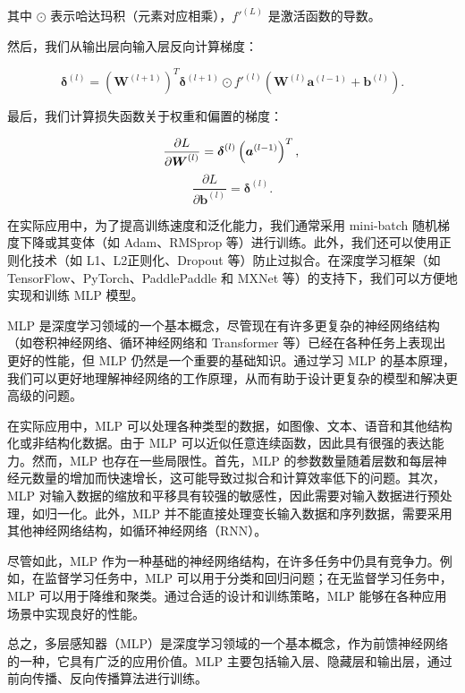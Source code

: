 其中 $\odot$ 表示哈达玛积（元素对应相乘），$f'^{(L)}$ 是激活函数的导数。

然后，我们从输出层向输入层反向计算梯度：

\begin{equation}
\boldsymbol{\delta}^{(l)} = \left( \boldsymbol{W}^{(l+1)} \right)^T \boldsymbol{\delta}^{(l+1)} \odot f'^{(l)}(\boldsymbol{W}^{(l)}\boldsymbol{a}^{(l-1)} + \boldsymbol{b}^{(l)}).
\end{equation}

最后，我们计算损失函数关于权重和偏置的梯度：

\begin{equation}
\frac{\partial L}{\partial \boldsymbol{W}^{(l)}} = \boldsymbol{\delta}^{(l)} \left( \boldsymbol{a}^{(l-1)} \right)^T, \\
\end{equation}
\begin{equation}
\frac{\partial L}{\partial \boldsymbol{b}^{(l)}} = \boldsymbol{\delta}^{(l)}.
\end{equation}

在实际应用中，为了提高训练速度和泛化能力，我们通常采用 mini-batch 随机梯度下降或其变体（如 Adam、RMSprop 等）进行训练。此外，我们还可以使用正则化技术（如 L1、L2正则化、Dropout 等）防止过拟合。在深度学习框架（如 TensorFlow、PyTorch、PaddlePaddle 和 MXNet 等）的支持下，我们可以方便地实现和训练 MLP 模型\cite{lecun2015deep}。

MLP 是深度学习领域的一个基本概念，尽管现在有许多更复杂的神经网络结构（如卷积神经网络、循环神经网络和 Transformer 等）已经在各种任务上表现出更好的性能，但 MLP 仍然是一个重要的基础知识。通过学习 MLP 的基本原理，我们可以更好地理解神经网络的工作原理，从而有助于设计更复杂的模型和解决更高级的问题。

在实际应用中，MLP 可以处理各种类型的数据，如图像、文本、语音和其他结构化或非结构化数据。由于 MLP 可以近似任意连续函数，因此具有很强的表达能力。然而，MLP 也存在一些局限性。首先，MLP 的参数数量随着层数和每层神经元数量的增加而快速增长，这可能导致过拟合和计算效率低下的问题。其次，MLP 对输入数据的缩放和平移具有较强的敏感性，因此需要对输入数据进行预处理，如归一化。此外，MLP 并不能直接处理变长输入数据和序列数据，需要采用其他神经网络结构，如循环神经网络（RNN）。

尽管如此，MLP 作为一种基础的神经网络结构，在许多任务中仍具有竞争力。例如，在监督学习任务中，MLP 可以用于分类和回归问题；在无监督学习任务中，MLP 可以用于降维和聚类。通过合适的设计和训练策略，MLP 能够在各种应用场景中实现良好的性能。

总之，多层感知器（MLP）是深度学习领域的一个基本概念，作为前馈神经网络的一种，它具有广泛的应用价值。MLP 主要包括输入层、隐藏层和输出层，通过前向传播、反向传播算法进行训练。
